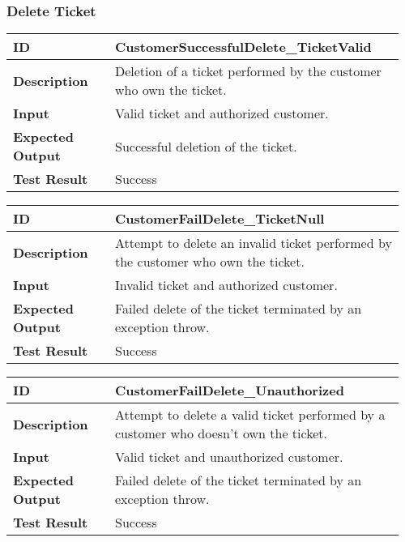 \subsubsection{Delete Ticket}
\begin{table}[H]
	\centering
	\begin{tabular}{@{}p{0.25\linewidth}p{0.71\linewidth}@{}}
		\toprule
		\textbf{ID} & CustomerSuccessfulDelete\_TicketValid \\
		\midrule
		\textbf{Description} & Deletion of a ticket performed by the customer who own the ticket. \\
		\midrule
		\textbf{Input} & Valid ticket and authorized customer.\\
		\midrule
		\textbf{Expected Output} & Successful deletion of the ticket.\\
		\midrule
		\textbf{Test Result} & Success\\
		\bottomrule
	\end{tabular}
\end{table}

\begin{table}[H]
	\centering
	\begin{tabular}{@{}p{0.25\linewidth}p{0.71\linewidth}@{}}
		\toprule
		\textbf{ID} & CustomerFailDelete\_TicketNull \\
		\midrule
		\textbf{Description} & Attempt to delete an invalid ticket performed by the customer who own the ticket. \\
		\midrule
		\textbf{Input} & Invalid ticket and authorized customer.\\
		\midrule
		\textbf{Expected Output} & Failed delete of the ticket terminated by an exception throw.\\
		\midrule
		\textbf{Test Result} & Success\\
		\bottomrule
	\end{tabular}
\end{table}

\begin{table}[H]
	\centering
	\begin{tabular}{@{}p{0.25\linewidth}p{0.71\linewidth}@{}}
		\toprule
		\textbf{ID} & CustomerFailDelete\_Unauthorized \\
		\midrule
		\textbf{Description} & Attempt to delete a valid ticket performed by a customer who doesn't own the ticket. \\
		\midrule
		\textbf{Input} & Valid ticket and unauthorized customer.\\
		\midrule
		\textbf{Expected Output} & Failed delete of the ticket terminated by an exception throw.\\
		\midrule
		\textbf{Test Result} & Success\\
		\bottomrule
	\end{tabular}
\end{table}

